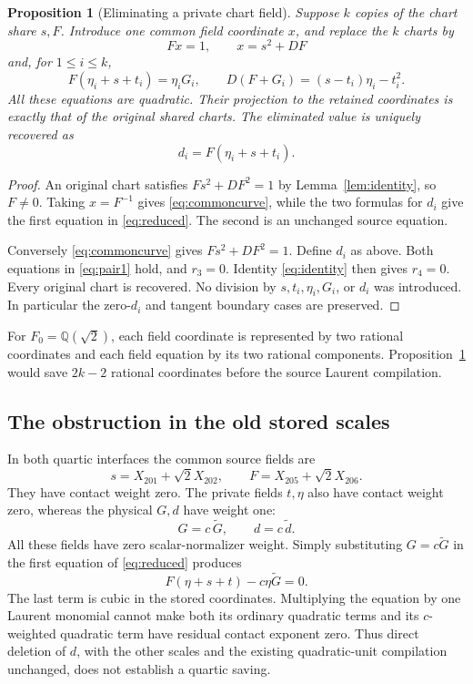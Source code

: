 \documentclass[11pt]{article}
\newtheorem{proposition}[theorem]{Proposition}
\newcommand{\Q}{\mathbb Q}
\begin{document}
\begin{proposition}[Eliminating a private chart field]
\label{prop:physical}
Suppose \(k\) copies of the chart share \(s,F\). Introduce
one common field coordinate \(x\), and replace the \(k\)
charts by
\begin{equation}\label{eq:commoncurve}
                    Fx=1,\qquad x=s^2+DF
\end{equation}
and, for \(1\le i\le k\),
\begin{equation}\label{eq:reduced}
 F(\eta_i+s+t_i)=\eta_iG_i,\qquad
 D(F+G_i)=(s-t_i)\eta_i-t_i^2 .
\end{equation}
All these equations are quadratic. Their projection to the
retained coordinates is exactly that of the original shared
charts. The eliminated value is uniquely recovered as
\[
                     d_i=F(\eta_i+s+t_i).
\]
\end{proposition}
\begin{proof}
An original chart satisfies \(Fs^2+DF^2=1\) by
Lemma~\ref{lem:identity}, so \(F\ne0\). Taking \(x=F^{-1}\)
gives \eqref{eq:commoncurve}, while the two formulas for
\(d_i\) give the first equation in \eqref{eq:reduced}.
The second is an unchanged source equation.

Conversely \eqref{eq:commoncurve} gives
\(Fs^2+DF^2=1\). Define \(d_i\) as above. Both equations
in \eqref{eq:pair1} hold, and \(r_3=0\).
Identity \eqref{eq:identity} then gives \(r_4=0\).
Every original chart is recovered. No division by
\(s,t_i,\eta_i,G_i\), or \(d_i\) was introduced. In
particular the zero-\(d_i\) and tangent boundary cases
are preserved.
\end{proof}

For \(F_0=\Q(\sqrt2)\), each field coordinate is represented
by two rational coordinates and each field equation by its
two rational components. Proposition~\ref{prop:physical}
would save \(2k-2\) rational coordinates before the source
Laurent compilation.

\subsection{The obstruction in the old stored scales}

In both quartic interfaces the common source fields are
\[
 s=X_{201}+\sqrt2X_{202},\qquad
 F=X_{205}+\sqrt2X_{206}.
\]
They have contact weight zero. The private fields
\(t,\eta\) also have contact weight zero, whereas
the physical \(G,d\) have weight one:
\[
                          G=c\,\widetilde G,\qquad
                          d=c\,\widetilde d .
\]
All these fields have zero scalar-normalizer weight.
Simply substituting \(G=c\widetilde G\) in the first
equation of \eqref{eq:reduced} produces
\[
              F(\eta+s+t)-c\eta\widetilde G=0.
\]
The last term is cubic in the stored coordinates. Multiplying
the equation by one Laurent monomial cannot make both its
ordinary quadratic terms and its \(c\)-weighted quadratic
term have residual contact exponent zero. Thus direct
deletion of \(d\), with the other scales and the existing
quadratic-unit compilation unchanged, does not establish
a quartic saving.
\end{document}
